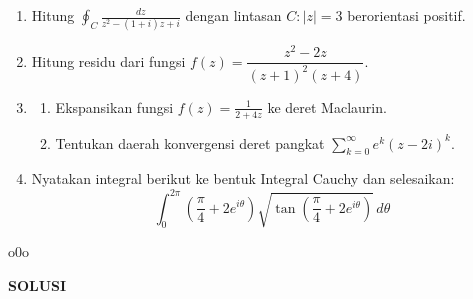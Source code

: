 \documentclass[11pt,letterpaper]{article}
\begin{document}
\begin{enumerate}
  \item Hitung
        $\displaystyle
          \oint_C \frac{dz}{z^2 - (1+i)z + i}
        $
        dengan lintasan $C : |z| = 3$ berorientasi positif.

  \item Hitung residu dari fungsi
        $
          f(z) = \dfrac{z^2 - 2z}{(z+1)^2(z+4)}.
        $

  \item
        \begin{enumerate}
          \item Ekspansikan fungsi
                $\displaystyle
                  f(z) = \frac{1}{2+4z}
                $
                ke deret Maclaurin.
          \item Tentukan daerah konvergensi deret pangkat
                $\displaystyle
                  \sum_{k=0}^{\infty} e^k(z-2i)^k.
                $
        \end{enumerate}

  \item Nyatakan integral berikut ke bentuk Integral Cauchy dan selesaikan:
        \[
          \int_0^{2\pi} \left(\frac{\pi}{4} + 2e^{i\theta}\right)
          \sqrt{\tan\left(\frac{\pi}{4} + 2e^{i\theta}\right)}\, d\theta
        \]
\end{enumerate}

\vspace{0.5cm}
\begin{center}
  \raisebox{.5ex}{\rule{0.5cm}{.4pt}}o0o\raisebox{.5ex}{\rule{0.5cm}{.4pt}}
\end{center}

\newpage
\begin{center}
  \textbf{SOLUSI}
\end{center}
\end{document}
